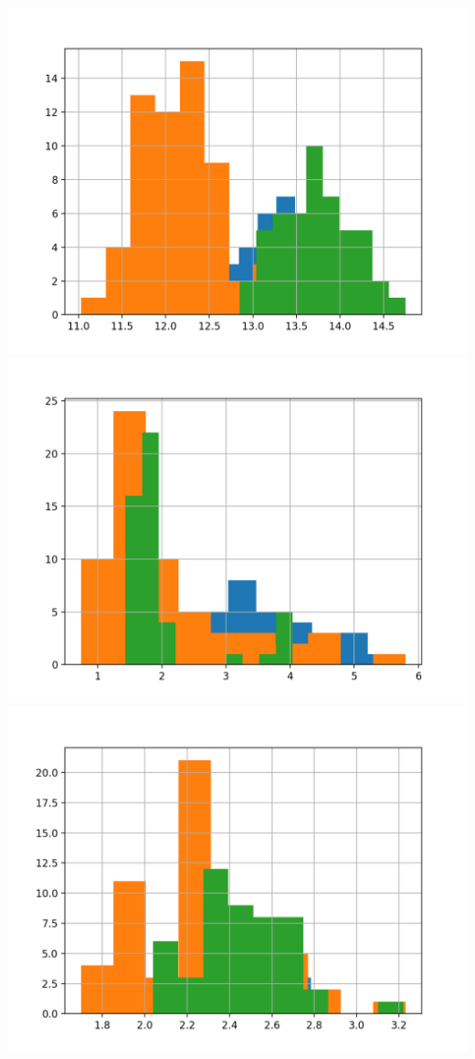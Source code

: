\documentclass{article}
\begin{document}
\includegraphics[width=\textwidth]{v1.png}\\
\includegraphics[width=\textwidth]{v2.png}\\
\includegraphics[width=\textwidth]{v3.png}\\
\end{document}
